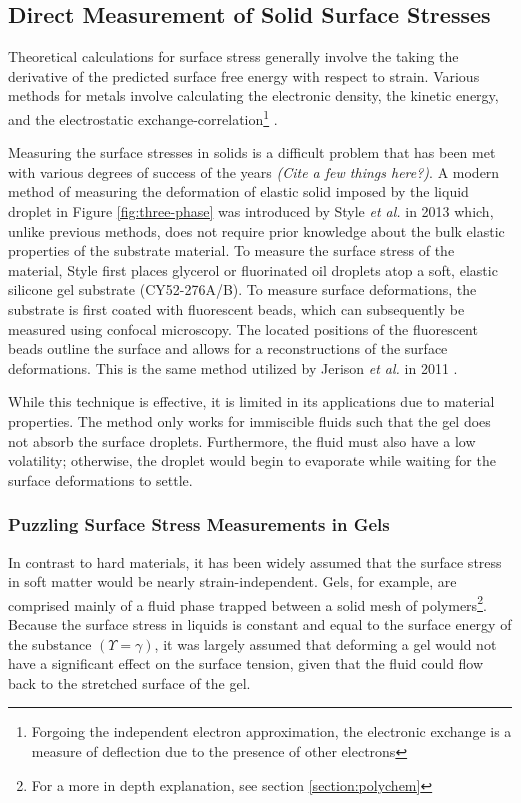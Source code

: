 \subsection{Direct Measurement of Solid Surface Stresses}
Theoretical calculations for surface stress generally involve the taking the derivative of the predicted surface free energy with respect to strain. Various methods for metals involve calculating the electronic density, the kinetic energy, and the electrostatic exchange-correlation\footnote{Forgoing the independent electron approximation, the electronic exchange is a measure of deflection due to the presence of other electrons} \cite{GURTIN1978431}. 



Measuring the surface stresses in solids is a difficult problem that has been met with various degrees of success of the years \emph{(Cite a few things here?)}. A modern method of measuring the deformation of elastic solid imposed by the liquid droplet in Figure \ref{fig:three-phase} was introduced by Style \emph{et al.} in 2013 \cite{style2013universal} which, unlike previous methods, does not require prior knowledge about the bulk elastic properties of the substrate material. To measure the surface stress of the material, Style first places glycerol or fluorinated oil droplets atop a soft, elastic silicone gel substrate (CY52-276A/B). To measure surface deformations, the substrate is first coated with fluorescent beads, which can subsequently be measured using confocal microscopy. The located positions of the fluorescent beads outline the surface and allows for a reconstructions of the surface deformations. This is the same method utilized by Jerison \emph{et al.} in 2011  \cite{jerison2011deformation}.







While this technique is effective, it is limited in its applications due to material properties. The method only works for immiscible fluids such that the gel does not absorb the surface droplets. Furthermore, the fluid must also have a low volatility; otherwise, the droplet would begin to evaporate while waiting for the surface deformations to settle.

\subsubsection{Puzzling Surface Stress Measurements in Gels}
In contrast to hard materials, it has been widely assumed that the surface stress in soft matter would be nearly strain-independent. Gels, for example, are comprised mainly of a fluid phase trapped between a solid mesh of polymers\footnote{For a more in depth explanation, see section \ref{section:polychem}}. Because the surface stress in liquids is constant and equal to the surface energy of the substance $(\Upsilon = \gamma)$, it was largely assumed that deforming a gel would not have a significant effect on the surface tension, given that the fluid could flow back to the stretched surface of the gel. 


